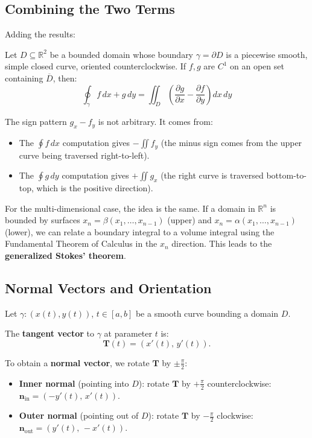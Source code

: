 \documentclass[11pt]{report}
\newcommand{\R}{\mathbb{R}}
\newcommand{\parti}[2]{\frac{\partial #1}{\partial #2}}
\begin{document}
\subsection*{Combining the Two Terms}

Adding the results:

\begin{theorem}
Let $D \subseteq \R^2$ be a bounded domain whose boundary $\gamma = \partial D$ is a piecewise smooth, simple closed curve, oriented counterclockwise. If $f, g$ are $C^1$ on an open set containing $\overline{D}$, then:
\[
\boxed{\oint_\gamma f \, dx + g \, dy = \iint_D \left( \parti{g}{x} - \parti{f}{y} \right) dx \, dy}
\]
\end{theorem}

\begin{remark}
The sign pattern $g_x - f_y$ is not arbitrary. It comes from:
\begin{itemize}
    \item The $\oint f \, dx$ computation gives $-\iint f_y$ (the minus sign comes from the upper curve being traversed right-to-left).
    \item The $\oint g \, dy$ computation gives $+\iint g_x$ (the right curve is traversed bottom-to-top, which is the positive direction).
\end{itemize}
\end{remark}

\begin{remark}
For the multi-dimensional case, the idea is the same. If a domain in $\R^n$ is bounded by surfaces $x_n = \beta(x_1, \ldots, x_{n-1})$ (upper) and $x_n = \alpha(x_1, \ldots, x_{n-1})$ (lower), we can relate a boundary integral to a volume integral using the Fundamental Theorem of Calculus in the $x_n$ direction. This leads to the \textbf{generalized Stokes' theorem}.
\end{remark}

\subsection{Normal Vectors and Orientation}

Let $\gamma: (x(t), y(t))$, $t \in [a, b]$ be a smooth curve bounding a domain $D$.

\begin{definition}
The \textbf{tangent vector} to $\gamma$ at parameter $t$ is:
\[
\mathbf{T}(t) = (x'(t), \, y'(t)).
\]

To obtain a \textbf{normal vector}, we rotate $\mathbf{T}$ by $\pm \frac{\pi}{2}$:
\begin{itemize}
    \item \textbf{Inner normal} (pointing into $D$): rotate $\mathbf{T}$ by $+\frac{\pi}{2}$ counterclockwise: $\mathbf{n}_{\text{in}} = (-y'(t), \, x'(t))$.
    \item \textbf{Outer normal} (pointing out of $D$): rotate $\mathbf{T}$ by $-\frac{\pi}{2}$ clockwise: $\mathbf{n}_{\text{out}} = (y'(t), \, -x'(t))$.
\end{itemize}
\end{definition}
\end{document}
